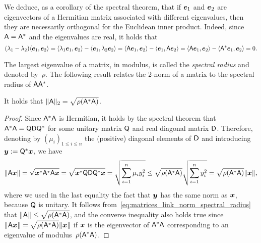We deduce, as a corollary of the spectral theorem,
that if $\mathbf{\boldsymbol{e}}_1$ and $\mathbf{\boldsymbol{e}}_2$ are eigenvectors of a Hermitian matrix associated with different eigenvalues,
then they are necessarily orthogonal for the Euclidean inner product.
Indeed, since $\mathsf A = \mathsf A^*$ and the eigenvalues are real, it holds that
\[
    (\lambda_1 - \lambda_2) \langle\mathbf{\boldsymbol{e}}_1, \mathbf{\boldsymbol{e}}_2\rangle
    = \langle\lambda_1 \mathbf{\boldsymbol{e}}_1, \mathbf{\boldsymbol{e}}_2\rangle - \langle\mathbf{\boldsymbol{e}}_1, \lambda_2 \mathbf{\boldsymbol{e}}_2\rangle
    = \langle\mathsf A \mathbf{\boldsymbol{e}}_1, \mathbf{\boldsymbol{e}}_2\rangle - \langle\mathbf{\boldsymbol{e}}_1, \mathsf A \mathbf{\boldsymbol{e}}_2\rangle
    = \langle\mathsf A \mathbf{\boldsymbol{e}}_1, \mathbf{\boldsymbol{e}}_2\rangle - \langle\mathsf A^* \mathbf{\boldsymbol{e}}_1, \mathbf{\boldsymbol{e}}_2\rangle = 0.
\]

The largest eigenvalue of a matrix, in modulus,
is called the \emph{spectral radius} and denoted by~$\rho$.
The following result relates the 2-norm of a matrix to the spectral radius of $\mathsf A \mathsf A^*$.
\begin{proposition}
    It holds that $\lVert\mathsf A\rVert_2 = \sqrt{\rho(\mathsf A^* \mathsf A)}$.
\end{proposition}
\begin{proof}
    Since $\mathsf A^* \mathsf A$ is Hermitian,
    it holds by the spectral theorem that $\mathsf A^* \mathsf A = \mathsf Q \mathsf D \mathsf Q^*$ for some unitary matrix $\mathsf Q$ and real diagonal matrix $\mathsf D$.
    Therefore, denoting by $(\mu_i)_{1 \leq i \leq n}$ the (positive) diagonal elements of $\mathsf D$
    and introducing $\mathbf{\boldsymbol{y}} := \mathsf Q^* \mathbf{\boldsymbol{x}}$,
    we have
    \begin{equation}
        \label{eq:matrices_link_norm_spectral_radius}
        \lVert\mathsf A \mathbf{\boldsymbol{x}}\rVert
        = \sqrt{\mathbf{\boldsymbol{x}}^* \mathsf A^* \mathsf A \mathbf{\boldsymbol{x}}}
        = \sqrt{\mathbf{\boldsymbol{x}}^* \mathsf Q \mathsf D \mathsf Q^* \mathbf{\boldsymbol{x}}}
        = \sqrt{\sum_{i=1}^{n} \mu_i y_i^2}
        \leq \sqrt{\rho(\mathsf A^* \mathsf A)} \sqrt{\sum_{i=1}^{n} y_i^2}
        =  \sqrt{\rho(\mathsf A^* \mathsf A)} \lVert\mathbf{\boldsymbol{x}}\rVert,
    \end{equation}
    where we used in the last equality the fact that $\mathbf{\boldsymbol{y}}$ has the same norm as $\mathbf{\boldsymbol{x}}$,
    because $\mathsf Q$ is unitary.
    It follows from~\eqref{eq:matrices_link_norm_spectral_radius} that $\lVert\mathsf A\rVert \leq \sqrt{\rho(\mathsf A^* \mathsf A)}$,
    and the converse inequality also holds true since $\lVert\mathsf A \mathbf{\boldsymbol{x}}\rVert = \sqrt{\rho(\mathsf A^* \mathsf A)} \lVert\mathbf{\boldsymbol{x}}\rVert$
    if $\mathbf{\boldsymbol{x}}$ is the eigenvector of $\mathsf A^* \mathsf A$ corresponding to an eigenvalue of modulus~$\rho(\mathsf A^* \mathsf A)$.
\end{proof}

